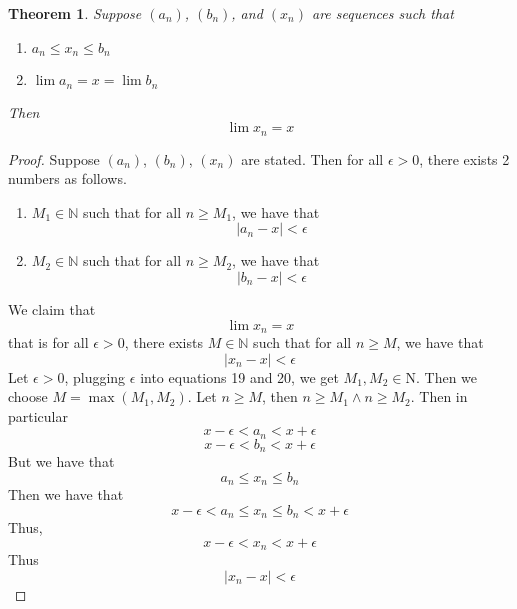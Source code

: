 \documentclass{article}
\newtheorem{theorem}{Theorem}[section]
\newtheorem{one minute paper}[theorem]{One Minute Paper}
\begin{document}
\begin{theorem}
    Suppose $(a_n)$, $(b_n)$, and $(x_n)$ are sequences such that 
    \begin{enumerate}
        \item $a_n \leq x_n \leq b_n$
        \item $\lim a_n = x = \lim b_n$
    \end{enumerate}
    Then
    \begin{equation}
        \lim x_n = x
    \end{equation}
\end{theorem}

\begin{proof}
    Suppose $(a_n)$, $(b_n)$, $(x_n)$ are stated. Then for all $\epsilon > 0$, there exists 2 numbers as follows. 
    \begin{enumerate}
        \item $M_1 \in \mathbb{N}$ such that for all $n \geq M_1$, we have that 
        \begin{equation}
            |a_n - x| < \epsilon
        \end{equation}
        \item $M_2 \in \mathbb{N}$ such that for all $n \geq M_2$, we have that 
        \begin{equation}
            |b_n - x| < \epsilon
        \end{equation}
    \end{enumerate}
    We claim that 
    \begin{equation}
        \lim x_n = x
    \end{equation}
    that is for all $\epsilon > 0$, there exists $M \in \mathbb{N}$ such that for all $n \geq M$, we have that 
    \begin{equation}
        |x_n - x| < \epsilon
    \end{equation}
    Let $\epsilon > 0$, plugging $\epsilon$ into equations 19 and 20, we get $M_1, M_2 \in \mbox{N}$. Then we choose $M = \max(M_1, M_2)$. 
    Let $n \geq M$, then $n \geq M_1 \land n \geq M_2$. Then in particular
    \begin{equation}
        x - \epsilon < a_n < x + \epsilon
    \end{equation}
    \begin{equation}
        x - \epsilon < b_n < x + \epsilon
    \end{equation}
    But we have that 
    \begin{equation}
        a_n \leq x_n \leq b_n
    \end{equation}
    Then we have that 
    \begin{equation}
        x - \epsilon < a_n \leq x_n \leq b_n < x + \epsilon
    \end{equation}
    Thus, 
    \begin{equation}
        x - \epsilon < x_n < x + \epsilon
    \end{equation}
    Thus
    \begin{equation}
        |x_n - x| < \epsilon
    \end{equation}
\end{proof}
\end{document}
